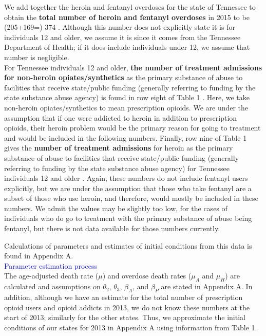 \documentclass[12pt]{article}
\begin{document}
We add together the heroin and fentanyl overdoses for the state of Tennessee to obtain the \textbf{total number of heroin and fentanyl overdoses} in 2015 to be (205+169=) 374 \cite{PDO}. Although this number does not explicitly state it is for individuals 12 and older, we assume it is since it comes from the Tennessee Department of Health; if it does include individuals under 12, we assume that number is negligible. \\

For Tennessee individuals 12 and older, \textbf{the number of treatment admissions for non-heroin opiates/synthetics} as the primary substance of abuse to facilities that receive state/public funding (generally referring to funding by the state substance abuse agency) is found in row eight of Table 1 \cite{TEDS2015_SAMSHA_admissions}. Here, we take non-heroin opiates/synthetics to mean prescription opioids. We are under the assumption that if one were addicted to heroin in addition to prescription opioids, their heroin problem would be the primary reason for going to treatment and would be included in the following numbers. Finally, row nine of Table 1 gives the \textbf{number of treatment admissions} for heroin as the primary substance of abuse to facilities that receive state/public funding (generally referring to funding by the state substance abuse agency) for Tennessee individuals 12 and older \cite{TEDS2015_SAMSHA_admissions}. Again, these numbers do not include fentanyl users explicitly, but we are under the assumption that those who take fentanyl are a subset of those who use heroin, and therefore, would mostly be included in these numbers. We admit the values may be slightly too low, for the cases of individuals who do go to treatment with the primary substance of abuse being fentanyl, but there is not data available for those numbers currently. 


Calculations of parameters and estimates of initial conditions from this data is found in Appendix A. \\



\textcolor{blue}{Parameter estimation process} \\
The age-adjusted death rate ($\mu$) and overdose death rates ($\mu_{A}$ and $\mu_{H}$) are calculated and assumptions on $\theta_2$, $\theta_3$, $\beta_A$, and $\beta_P$ are stated in Appendix A. In addition, although we have an estimate for the total number of prescription opioid users and opioid addicts in 2013, we do not know these numbers at the start of 2013; similarly for the other states. Thus, we approximate the initial conditions of our states for 2013 in Appendix A using information from Table 1. 
\end{document}
